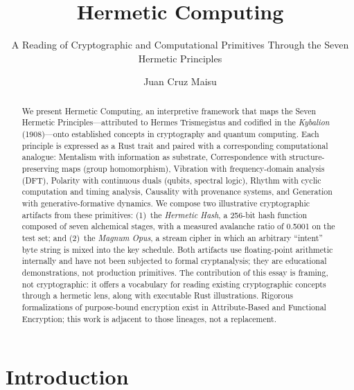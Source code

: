 \documentclass[sigplan,anonymous=false]{acmart}
\begin{document}
\title{Hermetic Computing}
\subtitle{A Reading of Cryptographic and Computational Primitives Through the Seven Hermetic Principles}

\author{Juan Cruz Maisu}

\begin{abstract}
We present Hermetic Computing, an interpretive framework that maps the Seven Hermetic Principles---attributed to Hermes Trismegistus and codified in the \emph{Kybalion} (1908)---onto established concepts in cryptography and quantum computing. Each principle is expressed as a Rust trait and paired with a corresponding computational analogue: Mentalism with information as substrate, Correspondence with structure-preserving maps (group homomorphism), Vibration with frequency-domain analysis (DFT), Polarity with continuous duals (qubits, spectral logic), Rhythm with cyclic computation and timing analysis, Causality with provenance systems, and Generation with generative-formative dynamics. We compose two illustrative cryptographic artifacts from these primitives: (1)~the \emph{Hermetic Hash}, a 256-bit hash function composed of seven alchemical stages, with a measured avalanche ratio of 0.5001 on the test set; and (2)~the \emph{Magnum Opus}, a stream cipher in which an arbitrary ``intent'' byte string is mixed into the key schedule. Both artifacts use floating-point arithmetic internally and have not been subjected to formal cryptanalysis; they are educational demonstrations, not production primitives. The contribution of this essay is framing, not cryptographic: it offers a vocabulary for reading existing cryptographic concepts through a hermetic lens, along with executable Rust illustrations. Rigorous formalizations of purpose-bound encryption exist in Attribute-Based and Functional Encryption; this work is adjacent to those lineages, not a replacement.
\end{abstract}


\maketitle

\section{Introduction}
\end{document}
